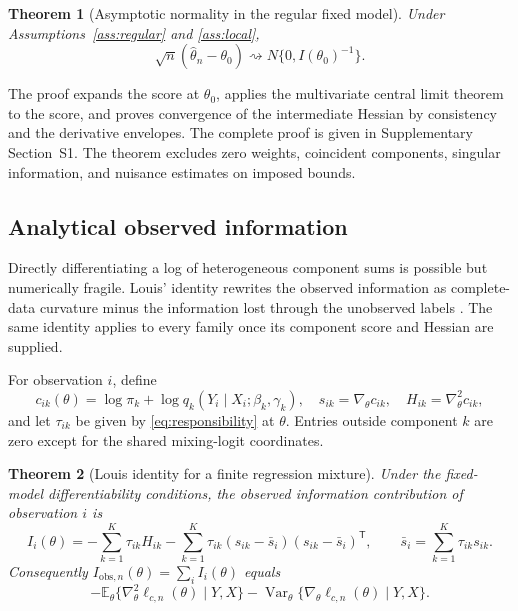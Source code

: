 \documentclass[a4paper,fleqn]{cas-sc}
\newtheorem{theorem}{Theorem}
\DeclareMathOperator{\Var}{Var}
\newcommand{\E}{\mathbb E}
\newcommand{\T}{\mathsf T}
\begin{document}
\begin{theorem}[Asymptotic normality in the regular fixed model]
\label{thm:normal}
Under Assumptions~\ref{ass:regular} and \ref{ass:local},
\[
  \sqrt n(\widehat\theta_n-\theta_0)
  \rightsquigarrow N\{0,I(\theta_0)^{-1}\}.
\]
\end{theorem}

The proof expands the score at $\theta_0$, applies the multivariate central limit theorem to the score, and proves convergence of the intermediate Hessian by consistency and the derivative envelopes. The complete proof is given in Supplementary Section~S1. The theorem excludes zero weights, coincident components, singular information, and nuisance estimates on imposed bounds.

\subsection{Analytical observed information}
\label{sec:louis}

Directly differentiating a log of heterogeneous component sums is possible but numerically fragile. Louis' identity rewrites the observed information as complete-data curvature minus the information lost through the unobserved labels \citep{louis1982information}. The same identity applies to every family once its component score and Hessian are supplied.

For observation $i$, define
\[
 c_{ik}(\theta)=\log\pi_k+\log q_k(Y_i\mid X_i;\beta_k,\gamma_k),
 \quad s_{ik}=\nabla_\theta c_{ik},
 \quad H_{ik}=\nabla_\theta^2c_{ik},
\]
and let $\tau_{ik}$ be given by \eqref{eq:responsibility} at $\theta$. Entries outside component $k$ are zero except for the shared mixing-logit coordinates.

\begin{theorem}[Louis identity for a finite regression mixture]
\label{thm:louis}
Under the fixed-model differentiability conditions, the observed information contribution of observation $i$ is
\begin{equation}
 I_i(\theta)=
 -\sum_{k=1}^K\tau_{ik}H_{ik}
 -\sum_{k=1}^K\tau_{ik}(s_{ik}-\bar s_i)(s_{ik}-\bar s_i)^\T,
 \qquad
 \bar s_i=\sum_{k=1}^K\tau_{ik}s_{ik}.
 \label{eq:louis}
\end{equation}
Consequently $I_{\mathrm{obs},n}(\theta)=\sum_i I_i(\theta)$ equals
\[
 -\E_\theta\{\nabla_\theta^2\ell_{c,n}(\theta)\mid Y,X\}
 -\Var_\theta\{\nabla_\theta\ell_{c,n}(\theta)\mid Y,X\}.
\]
\end{theorem}
\end{document}
